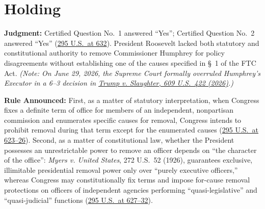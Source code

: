 \documentclass[12pt]{article}
\begin{document}
\section{Holding}

\textbf{Judgment:} Certified Question No.\ 1 answered ``Yes''; Certified Question No.\ 2 answered ``Yes'' (\href{https://supreme.justia.com/cases/federal/us/295/602/}{295 U.S.\ at 632}). President Roosevelt lacked both statutory and constitutional authority to remove Commissioner Humphrey for policy disagreements without establishing one of the causes specified in \S\ 1 of the FTC Act. \textit{(Note: On June 29, 2026, the Supreme Court formally overruled Humphrey's Executor in a 6--3 decision in \href{https://supreme.justia.com/cases/federal/us/609/25-332/}{Trump v. Slaughter, 609 U.S.\ 422 (2026)}.)}

\textbf{Rule Announced:} First, as a matter of statutory interpretation, when Congress fixes a definite term of office for members of an independent, nonpartisan commission and enumerates specific causes for removal, Congress intends to prohibit removal during that term except for the enumerated causes (\href{https://supreme.justia.com/cases/federal/us/295/602/}{295 U.S.\ at 623--26}). Second, as a matter of constitutional law, whether the President possesses an unrestrictable power to remove an officer depends on ``the character of the office'': \textit{Myers v. United States}, 272 U.S.\ 52 (1926), guarantees exclusive, illimitable presidential removal power only over ``purely executive officers,'' whereas Congress may constitutionally fix terms and impose for-cause removal protections on officers of independent agencies performing ``quasi-legislative'' and ``quasi-judicial'' functions (\href{https://supreme.justia.com/cases/federal/us/295/602/}{295 U.S.\ at 627--32}).
\end{document}

